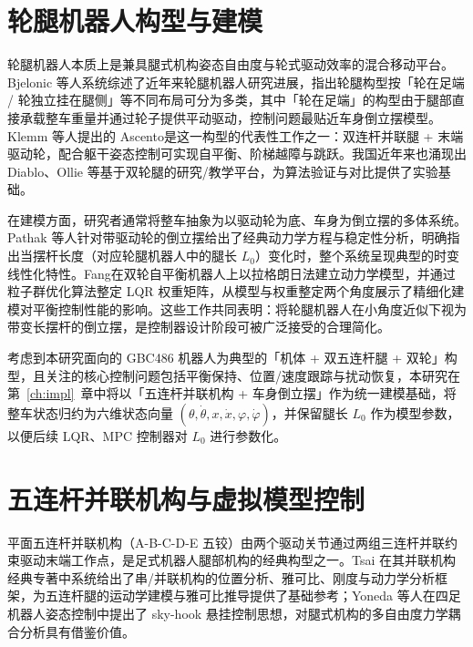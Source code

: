 \documentclass{smbuthesis}
\begin{document}
\section{轮腿机器人构型与建模}

轮腿机器人本质上是兼具腿式机构姿态自由度与轮式驱动效率的混合移动平台。Bjelonic 等人\cite{Bjelonic2019KeepRollin}系统综述了近年来轮腿机器人研究进展，指出轮腿构型按「轮在足端 / 轮独立挂在腿侧」等不同布局可分为多类，其中「轮在足端」的构型由于腿部直接承载整车重量并通过轮子提供平动驱动，控制问题最贴近车身倒立摆模型。Klemm 等人提出的 Ascento\cite{Klemm2019Ascento}是这一构型的代表性工作之一：双连杆并联腿 + 末端驱动轮，配合躯干姿态控制可实现自平衡、阶梯越障与跳跃。我国近年来也涌现出 Diablo、Ollie 等基于双轮腿的研究/教学平台\cite{Wang2021WheelLegged}，为算法验证与对比提供了实验基础。

在建模方面，研究者通常将整车抽象为以驱动轮为底、车身为倒立摆的多体系统。Pathak 等人针对带驱动轮的倒立摆给出了经典动力学方程与稳定性分析\cite{Pathak2005WheeledIP}，明确指出当摆杆长度（对应轮腿机器人中的腿长 $L_0$）变化时，整个系统呈现典型的时变线性化特性。Fang\cite{Fang2014PSOLQR}在双轮自平衡机器人上以拉格朗日法建立动力学模型，并通过粒子群优化算法整定 LQR 权重矩阵，从模型与权重整定两个角度展示了精细化建模对平衡控制性能的影响。这些工作共同表明：将轮腿机器人在小角度近似下视为带变长摆杆的倒立摆，是控制器设计阶段可被广泛接受的合理简化。

考虑到本研究面向的 GBC486 机器人为典型的「机体 + 双五连杆腿 + 双轮」构型，且关注的核心控制问题包括平衡保持、位置/速度跟踪与扰动恢复，本研究在第~\ref{ch:impl}~章中将以「五连杆并联机构 + 车身倒立摆」作为统一建模基础，将整车状态归约为六维状态向量 $(\theta, \dot\theta, x, \dot x, \varphi, \dot\varphi)$，并保留腿长 $L_0$ 作为模型参数，以便后续 LQR、MPC 控制器对 $L_0$ 进行参数化。

\section{五连杆并联机构与虚拟模型控制}

平面五连杆并联机构（A-B-C-D-E 五铰）由两个驱动关节通过两组三连杆并联约束驱动末端工作点，是足式机器人腿部机构的经典构型之一。Tsai 在其并联机构经典专著\cite{Tsai1999RobotAnalysis}中系统给出了串/并联机构的位置分析、雅可比、刚度与动力学分析框架，为五连杆腿的运动学建模与雅可比推导提供了基础参考；Yoneda 等人\cite{Yoneda1994SkyHook}在四足机器人姿态控制中提出了 sky-hook 悬挂控制思想，对腿式机构的多自由度力学耦合分析具有借鉴价值。
\end{document}

